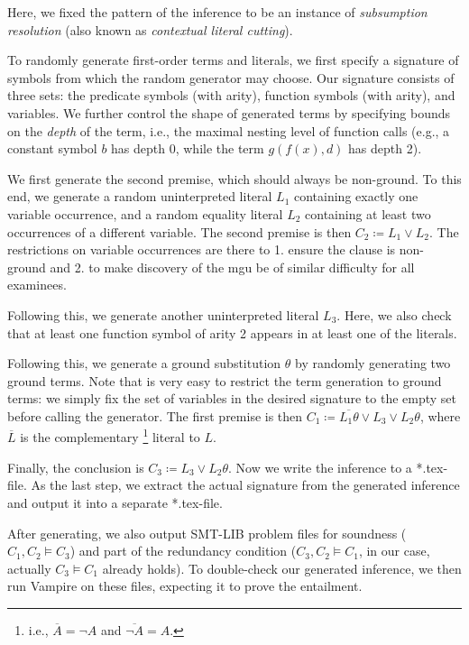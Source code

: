 Here, we fixed the pattern of the inference
to be an instance of \emph{subsumption resolution} (also known as \emph{contextual literal cutting}).

To randomly generate first-order terms and literals,
we first specify a signature of symbols from which the random generator may choose.
Our signature consists of three sets:
the predicate symbols (with arity),
function symbols (with arity),
and variables.
We further control the shape of generated terms
by specifying bounds on the \emph{depth} of the term,
i.e., the maximal nesting level of function calls
(e.g., a constant symbol $b$ has depth 0, while the term $g(f(x),d)$ has depth 2).

We first generate the second premise, which should always be non-ground.
To this end, we generate a random uninterpreted literal $L_1$ containing exactly one variable occurrence,
and a random equality literal $L_2$ containing at least two occurrences of a different variable.
The second premise is then $C_2 \coloneqq L_1 \lor L_2$.
The restrictions on variable occurrences are there to 1. ensure the clause is non-ground
and 2. to make discovery of the mgu be of similar difficulty for all examinees.

Following this, we generate another uninterpreted literal $L_3$.
Here, we also check that at least one function symbol of arity 2 appears in at least one of the literals.

Following this, we generate a ground substitution $\theta$ by randomly generating two ground terms.
Note that is very easy to restrict the term generation to ground terms:
we simply fix the set of variables in the desired signature to the empty set before calling the generator.
The first premise is then $C_1 \coloneqq \overline{L_1\theta} \lor L_3 \lor L_2\theta$,
where $\overline{L}$ is the complementary%
\footnote{i.e., $\overline{A} = \lnot A$ and $\overline{\lnot A} = A$.}
literal to $L$.

Finally, the conclusion is $C_3 \coloneqq L_3 \lor L_2\theta$.
Now we write the inference to a *.tex-file.
As the last step,
we extract the actual signature from the generated inference and output it into a separate *.tex-file.

After generating, we also output SMT-LIB problem files for
soundness ($C_1, C_2 \models C_3$)
and part of the redundancy condition ($C_3, C_2 \models C_1$, in our case, actually $C_3 \models C_1$ already holds).
To double-check our generated inference, we then run Vampire on these files,
expecting it to prove the entailment.
